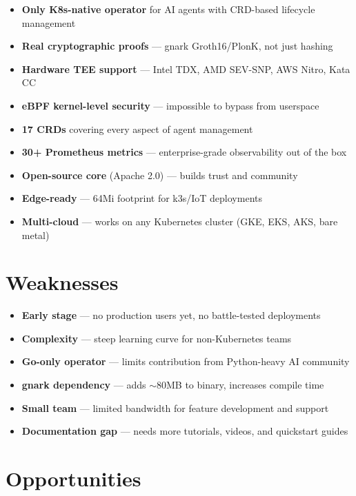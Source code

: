 \documentclass[12pt,a4paper,openany]{report}
\begin{document}
\begin{itemize}[label=\textcolor{agentk-green}{\textbf{+}}]
    \item \textbf{Only K8s-native operator} for AI agents with CRD-based lifecycle management
    \item \textbf{Real cryptographic proofs} — gnark Groth16/PlonK, not just hashing
    \item \textbf{Hardware TEE support} — Intel TDX, AMD SEV-SNP, AWS Nitro, Kata CC
    \item \textbf{eBPF kernel-level security} — impossible to bypass from userspace
    \item \textbf{17 CRDs} covering every aspect of agent management
    \item \textbf{30+ Prometheus metrics} — enterprise-grade observability out of the box
    \item \textbf{Open-source core} (Apache 2.0) — builds trust and community
    \item \textbf{Edge-ready} — 64Mi footprint for k3s/IoT deployments
    \item \textbf{Multi-cloud} — works on any Kubernetes cluster (GKE, EKS, AKS, bare metal)
\end{itemize}

\section{Weaknesses}

\begin{itemize}[label=\textcolor{agentk-red}{\textbf{-}}]
    \item \textbf{Early stage} — no production users yet, no battle-tested deployments
    \item \textbf{Complexity} — steep learning curve for non-Kubernetes teams
    \item \textbf{Go-only operator} — limits contribution from Python-heavy AI community
    \item \textbf{gnark dependency} — adds $\sim$80MB to binary, increases compile time
    \item \textbf{Small team} — limited bandwidth for feature development and support
    \item \textbf{Documentation gap} — needs more tutorials, videos, and quickstart guides
\end{itemize}

\section{Opportunities}
\end{document}
